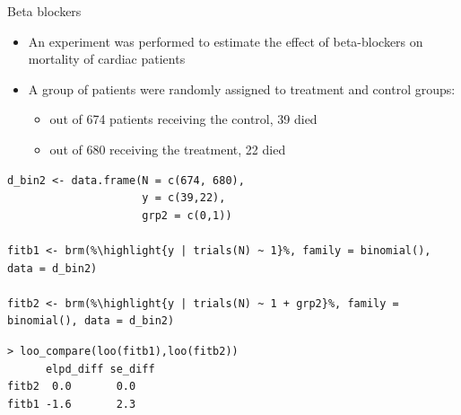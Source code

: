 \documentclass[english,t]{beamer}
\newcommand{\reducedstrut}{\vrule width 0pt height .9\ht\strutbox depth .9\dp\strutbox\relax}
\newcommand{\highlight}[1]{%
  \begingroup
  \setlength{\fboxsep}{0pt}%
  \colorbox{yellow!30}{\reducedstrut\detokenize{#1}\/}%
  \endgroup
}
\begin{document}
\begin{frame}[fragile]{Beta blockers}

\begin{itemize}
  \item An experiment was performed to estimate the effect of
    beta-blockers on mortality of cardiac patients
  \item A group of
    patients were randomly assigned to treatment and control groups:
    \begin{itemize}
    \item out of 674 patients receiving the control, 39 died
    \item out of 680 receiving the treatment, 22 died
    \end{itemize}
  \end{itemize}

\begin{verbatim}
d_bin2 <- data.frame(N = c(674, 680),
                     y = c(39,22),
                     grp2 = c(0,1))

fitb1 <- brm(%\highlight{y | trials(N) ~ 1}%, family = binomial(), data = d_bin2)

fitb2 <- brm(%\highlight{y | trials(N) ~ 1 + grp2}%, family = binomial(), data = d_bin2)
\end{verbatim}
  \pause
\begin{verbatim}
> loo_compare(loo(fitb1),loo(fitb2))
      elpd_diff se_diff
fitb2  0.0       0.0   
fitb1 -1.6       2.3   
\end{verbatim}
\end{frame}
\end{document}
